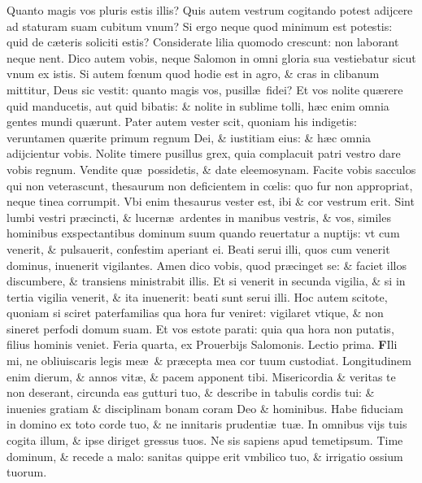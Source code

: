 \documentclass[a5paper,10pt]{book}
\def\rightmarginnote{%
	\lrmarginnote{\hskip\columnwidth \hskip -1em}}
\def\ae{æ}
\def\oe{œ}
\begin{document}
\begin{multicols*}{2}
Quanto magis vos pluris estis illis? Quis autem vestrum cogitando potest adijcere ad staturam suam cubitum vnum?
Si ergo neque quod minimum est potestis: quid de c\ae teris soliciti estis?
Considerate lilia quomodo crescunt: non laborant neque nent. Dico autem vobis, neque Salomon in omni gloria sua vestiebatur sicut vnum ex istis.
Si autem f\oe num quod hodie est in agro, \& cras in clibanum mittitur, Deus sic vestit: quanto magis vos, pusill\ae \ fidei?
Et vos nolite qu\ae rere quid manducetis, aut quid bibatis: \& nolite in sublime tolli, h\ae c enim omnia gentes mundi qu\ae runt.
Pater autem vester scit, quoniam his indigetis: veruntamen qu\ae rite primum regnum Dei, \& iustitiam eius: \& h\ae c omnia adijcientur vobis.
Nolite timere pusillus grex, quia complacuit patri
vestro dare vobis regnum.
Vendite qu\ae \ possidetis, \& date eleemosynam. Facite vobis sacculos qui non veterascunt, thesaurum non deficientem in c\oe lis: quo fur non appropriat, neque tinea corrumpit.
Vbi enim thesaurus vester est, ibi \& cor vestrum erit. Sint lumbi vestri pr\ae cincti, \& lucern\ae \ ardentes in manibus vestris, \& vos, similes hominibus exspectantibus dominum suum quando reuertatur a nuptijs: vt cum venerit, \& pulsauerit, confestim aperiant ei.
Beati serui illi, quos cum venerit dominus, inuenerit vigilantes. Amen dico vobis, quod pr\ae cinget se: \& faciet illos discumbere, \& transiens ministrabit illis.
Et si venerit in secunda vigilia, \& si in tertia vigilia venerit, \& ita inuenerit: beati sunt serui illi.
Hoc autem scitote, quoniam si sciret paterfamilias qua hora fur veniret: vigilaret vtique, \& non sineret perfodi domum suam.
Et vos estote parati: quia qua hora non putatis, filius hominis veniet.
\newline {} \color{red} \hypertarget{WED-PRIMA-POST-ADV}{Feria quarta,} ex Prouerbijs Salomonis. \hfill Lectio prima. \color{black}
\vspace{-2.25em}
\lettrine[lines=2]{\bfseries F}{}Ili\rightmarginnote{ca. 3.} mi, ne obliuiscaris legis me\ae \ \& pr\ae cepta mea cor tuum custodiat.
Longitudinem enim dierum, \& annos vit\ae , \& pacem apponent tibi.
Misericordia \& veritas te non deserant, circunda eas gutturi tuo, \& describe in tabulis cordis tui: \& inuenies gratiam \& disciplinam bonam coram Deo \& hominibus.
Habe fiduciam in domino ex toto corde tuo, \& ne innitaris prudenti\ae \ tu\ae .
In omnibus vijs tuis cogita illum, \& ipse diriget gressus tuos.
Ne sis sapiens apud temetipsum. Time dominum, \& recede a malo: sanitas quippe erit vmbilico tuo, \& irrigatio ossium tuorum.

\end{multicols*}
\end{document}
